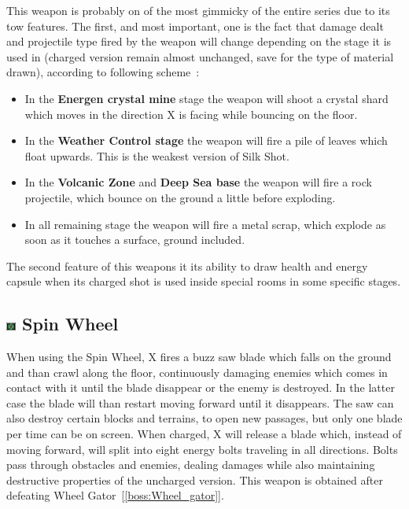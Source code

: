 This weapon is probably on of the most gimmicky of the entire series due to its tow features. The first, and most important, one is the fact that damage dealt and projectile type fired by the weapon will change depending on the stage it is used in (charged version remain almost unchanged, save for the type of material drawn), according to following scheme~\cite{wiki:Silk_shot}:
\begin{itemize}
	\item In the \textbf{Energen crystal mine} stage the weapon will shoot a crystal shard which moves in the direction X is facing while bouncing on the floor.
	\item In the \textbf{Weather Control stage} the weapon will fire a pile of leaves  which float upwards. This is the weakest version of Silk Shot.
	\item In the \textbf{Volcanic Zone} and \textbf{Deep Sea base} the weapon will fire a rock projectile, which bounce on the ground a little before exploding.
	\item In all remaining stage the weapon will fire a metal scrap, which explode as soon as it touches a surface, ground included.
\end{itemize}

The second feature of this weapons it its ability to draw health and energy capsule when its charged shot is used inside special rooms in some specific stages.


\subsection{\includegraphics[width=12px, height=10px]{figures/X2/weapons/S_wheel.png} Spin Wheel}\label{Spinning_wheel}
When using the Spin Wheel, X fires a buzz saw blade which falls on the ground and than crawl along the floor, continuously damaging enemies which comes in contact with it until the blade disappear or the enemy is destroyed. In the latter case the blade will than restart moving forward until it disappears. The saw can also destroy certain blocks and terrains, to open new passages, but only one blade per time can be on screen. When charged, X will release a blade which, instead of moving forward, will split into eight energy bolts traveling in all directions. Bolts pass through obstacles and enemies, dealing damages while also maintaining destructive properties of the uncharged version. This weapon is obtained after defeating Wheel Gator~[\ref{boss:Wheel_gator}].

